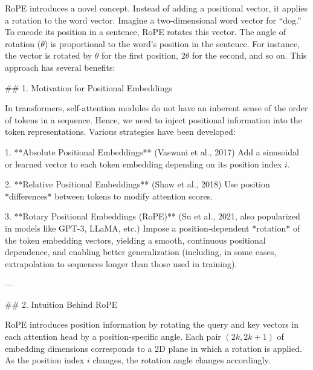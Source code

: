 RoPE introduces a novel concept. Instead of adding a positional vector, it applies a rotation to the word vector. Imagine a two-dimensional word vector for ``dog.'' To encode its position in a sentence, RoPE rotates this vector. The angle of rotation ($\theta$) is proportional to the word's position in the sentence. For instance, the vector is rotated by $\theta$ for the first position, $2\theta$ for the second, and so on. This approach has several benefits:


## 1. Motivation for Positional Embeddings

In transformers, self-attention modules do not have an inherent sense of the order of tokens in a sequence. Hence, we need to inject positional information into the token representations. Various strategies have been developed:

1. **Absolute Positional Embeddings** (Vaswani et al., 2017)  
   \- Add a sinusoidal or learned vector to each token embedding depending on its position index \( i \).  

2. **Relative Positional Embeddings** (Shaw et al., 2018)  
   \- Use position *differences* between tokens to modify attention scores.

3. **Rotary Positional Embeddings (RoPE)** (Su et al., 2021, also popularized in models like GPT-3, LLaMA, etc.)  
   \- Impose a position-dependent *rotation* of the token embedding vectors, yielding a smooth, continuous positional dependence, and enabling better generalization (including, in some cases, extrapolation to sequences longer than those used in training).

---

## 2. Intuition Behind RoPE

RoPE introduces position information by rotating the query and key vectors in each attention head by a position-specific angle. Each pair \((2k, 2k+1)\) of embedding dimensions corresponds to a 2D plane in which a rotation is applied. As the position index \(i\) changes, the rotation angle changes accordingly.

